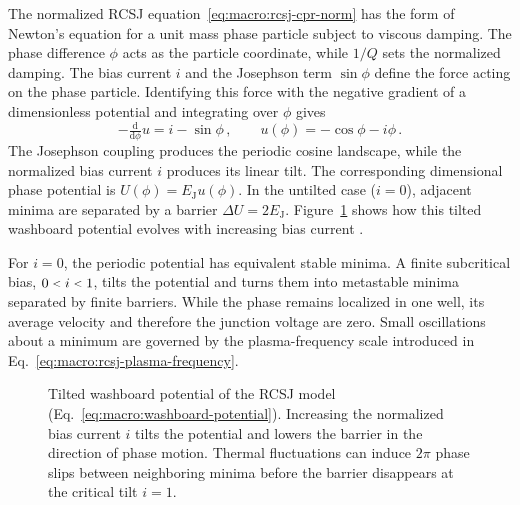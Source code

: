             The normalized RCSJ equation~\eqref{eq:macro:rcsj-cpr-norm} has the form of Newton's equation for a unit mass phase particle subject to viscous damping. The phase difference $\phi$ acts as the particle coordinate, while $1/Q$ sets the normalized damping. The bias current $i$ and the Josephson term $\sin\phi$ define the force acting on the phase particle. Identifying this force with the negative gradient of a dimensionless potential and integrating over $\phi$ gives
            \begin{equation}
                -\tfrac{\mathrm{d}}{\mathrm{d}\phi}u=i-\sin\phi\,,
                \qquad
                u(\phi)=-\cos\phi-i\phi\,.
                \label{eq:macro:washboard-potential}
            \end{equation}
            The Josephson coupling produces the periodic cosine landscape, while the normalized bias current $i$ produces its linear tilt. The corresponding dimensional phase potential is $U(\phi)=E_\mathrm{J}u(\phi)$. In the untilted case ($i=0$), adjacent minima are separated by a barrier $\Delta U=2E_\mathrm{J}$. Figure~\ref{fig:macro:rcsj-u-phi} shows how this tilted washboard potential evolves with increasing bias current \cite{stewart_currentvoltage_1968,tinkham_introduction_2004}.

            For $i=0$, the periodic potential has equivalent stable minima. A finite subcritical bias, $0\slt{}i\slt{}1$, tilts the potential and turns them into metastable minima separated by finite barriers. While the phase remains localized in one well, its average velocity and therefore the junction voltage are zero. Small oscillations about a minimum are governed by the plasma-frequency scale introduced in Eq.~\eqref{eq:macro:rcsj-plasma-frequency}.

            \begin{figure}
                \captionsetup{format=plain}%
                \centering
                \vspace{-.5em}
                \caption{
                    Tilted washboard potential of the RCSJ model (Eq.~\ref{eq:macro:washboard-potential}). Increasing the normalized bias current $i$ tilts the potential and lowers the barrier in the direction of phase motion. Thermal fluctuations can induce $2\pi$ phase slips between neighboring minima before the barrier disappears at the critical tilt $i=1$.
                }
                \label{fig:macro:rcsj-u-phi}
            \end{figure}
            
